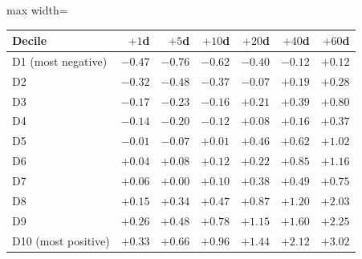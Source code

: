 {\small
\begin{adjustbox}{max width=\linewidth}
\begin{tabular}{lrrrrrr}
\toprule
Decile & $+1$d & $+5$d & $+10$d & $+20$d & $+40$d & $+60$d \\
\midrule
D1 (most negative) & $-0.47$ & $-0.76$ & $-0.62$ & $-0.40$ & $-0.12$ & $+0.12$ \\
D2 & $-0.32$ & $-0.48$ & $-0.37$ & $-0.07$ & $+0.19$ & $+0.28$ \\
D3 & $-0.17$ & $-0.23$ & $-0.16$ & $+0.21$ & $+0.39$ & $+0.80$ \\
D4 & $-0.14$ & $-0.20$ & $-0.12$ & $+0.08$ & $+0.16$ & $+0.37$ \\
D5 & $-0.01$ & $-0.07$ & $+0.01$ & $+0.46$ & $+0.62$ & $+1.02$ \\
D6 & $+0.04$ & $+0.08$ & $+0.12$ & $+0.22$ & $+0.85$ & $+1.16$ \\
D7 & $+0.06$ & $+0.00$ & $+0.10$ & $+0.38$ & $+0.49$ & $+0.75$ \\
D8 & $+0.15$ & $+0.34$ & $+0.47$ & $+0.87$ & $+1.20$ & $+2.03$ \\
D9 & $+0.26$ & $+0.48$ & $+0.78$ & $+1.15$ & $+1.60$ & $+2.25$ \\
D10 (most positive) & $+0.33$ & $+0.66$ & $+0.96$ & $+1.44$ & $+2.12$ & $+3.02$ \\
\bottomrule
\end{tabular}
\end{adjustbox}
}
